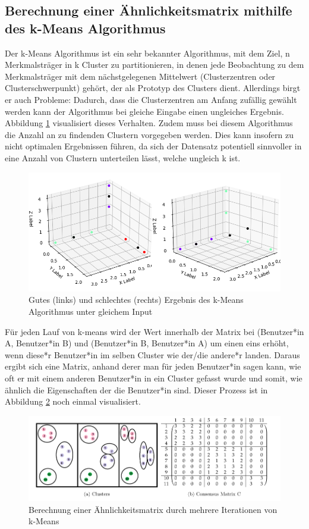 \subsection{Berechnung einer Ähnlichkeitsmatrix mithilfe des k-Means Algorithmus}
Der k-Means Algorithmus ist ein sehr bekannter Algorithmus, mit dem Ziel, n Merkmalsträger in k Cluster zu partitionieren, in denen jede Beobachtung zu dem Merkmalsträger mit dem nächstgelegenen Mittelwert (Clusterzentren oder Clusterschwerpunkt) gehört, der als Prototyp des Clusters dient. Allerdings birgt er auch Probleme: Dadurch, dass die Clusterzentren am Anfang zufällig gewählt werden kann der Algorithmus bei gleiche Eingabe einen ungleiches Ergebnis. Abbildung \ref{fig:kmeans} visualisiert dieses Verhalten. Zudem muss bei diesem Algorithmus die Anzahl an zu findenden Clustern vorgegeben werden. Dies kann insofern zu nicht optimalen Ergebnissen führen, da sich der Datensatz potentiell sinnvoller in eine Anzahl von Clustern unterteilen lässt, welche ungleich k ist. 
\begin{figure}[h]
	\centering
	\includegraphics[width=\linewidth]{images/gutes_schlechtes_kmeans}
	\caption{Gutes (links) und schlechtes (rechts) Ergebnis des k-Means Algorithmus unter gleichem Input}
	\label{fig:kmeans}
\end{figure}
Für jeden Lauf von k-means wird der Wert innerhalb der Matrix bei (Benutzer*in A, Benutzer*in B) und (Benutzer*in B, Benutzer*in A) um einen eins erhöht, wenn diese*r Benutzer*in im selben Cluster wie der/die andere*r landen. Daraus ergibt sich eine Matrix, anhand derer man für jeden Benutzer*in sagen kann, wie oft er mit einem anderen Benutzer*in in ein Cluster gefasst wurde und somit, wie ähnlich die Eigenschaften der die Benutzer*in sind. Dieser Prozess ist in Abbildung \ref{fig:consensus_matrix}\cite{Godfrey.21.08.2014} noch einmal visualisiert.
\begin{figure}[h]
	\centering
	\includegraphics[width=\linewidth]{images/consensus_matrix}
	\caption{Berechnung einer Ähnlichkeitsmatrix durch mehrere Iterationen von k-Means}
	\label{fig:consensus_matrix}
\end{figure}
